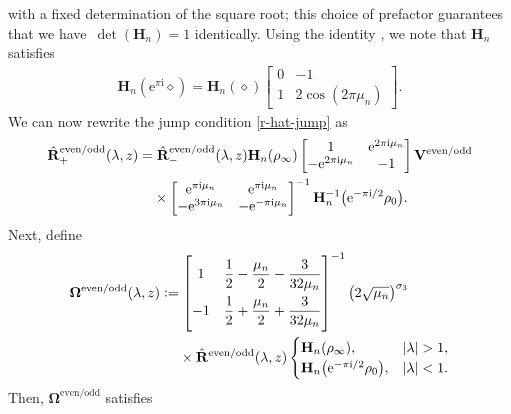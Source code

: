 \documentclass[11pt]{article}
\numberwithin{equation}{section}
\numberwithin{equation}{section}
\newcommand{\ee}{\mathrm{e}}
\newcommand{\ii}{\mathrm{i}}
\begin{document}
with a fixed determination of the square root; this choice of prefactor guarantees that we have~$\det (\mathbf{H}_n ) = 1$ identically. Using the identity \cite[equation~(10.11.4)]{DLMF}, we note that $\mathbf{H}_n$ satisfies
\begin{gather}
\label{Bn-jump}
\mathbf{H}_n(\ee^{\pi \ii}\diamond) = \mathbf{H}_n(\diamond) \begin{bmatrix}
0 & -1 \\ 1 & 2\cos(2\pi \mu_n)
\end{bmatrix}.
\end{gather}
We can now rewrite the jump condition \eqref{r-hat-jump} as
\begin{align*}
 &\hat{\mathbf{R}}^\mathrm{even/odd}_+(\lambda,z)= \hat{\mathbf{R}}^\mathrm{even/odd}_-(\lambda,z) \mathbf{H}_n(\rho_\infty) \begin{bmatrix} 1 & \ee^{2\pi \ii \mu_n} \\ -\ee^{2\pi \ii \mu_n} & -1 \end{bmatrix} \mathbf{V}^\mathrm{even/odd}\\
 & \hphantom{\hat{\mathbf{R}}^\mathrm{even/odd}_+(\lambda,z)=}{}
 \times \begin{bmatrix} \ee^{\pi \ii \mu_n}& \ee^{\pi \ii \mu_n}\\ - \ee^{3\pi \ii \mu_n} & - \ee^{-\pi \ii \mu_n} \end{bmatrix}^{-1} \mathbf{H}_n^{-1}\big(\ee^{-\pi \ii/2}\rho_0\big).
\end{align*}
Next, define
\begin{align}
 & \mathbf{\Omega}^\mathrm{even/odd} (\lambda, z) := \begin{bmatrix} 1 & \dfrac{1}{2} - \dfrac{\mu_n}{2} - \dfrac{3}{32\mu_n} \vspace{1.5mm}\\ -1 & \dfrac{1}{2} + \dfrac{\mu_n}{2} + \dfrac{3}{32\mu_n} \end{bmatrix}^{-1} \big(2\sqrt{\mu_n}\big)^{\sigma_3}\nonumber\\
 &\hphantom{\mathbf{\Omega}^\mathrm{even/odd} (\lambda, z) :=}{}
 \times\hat{\mathbf{R}}^\mathrm{even/odd}(\lambda, z) \begin{cases}
 \mathbf{H}_n(\rho_\infty), & |\lambda| >1, \\
 \mathbf{H}_n\big(\ee^{-\pi \ii/2}\rho_0\big), & |\lambda| < 1.
 \end{cases}
 \label{eq:Omega-def}
\end{align}
Then, $\mathbf{\Omega}^\mathrm{even/odd}$ satisfies
\end{document}
